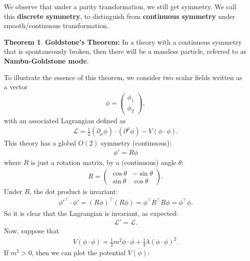 \documentclass[a4paper,11pt]{article}
\numberwithin{equation}{section}
\theoremstyle{definition}
\newtheorem{thm}{Theorem}[section]
\newcommand{\p}{\partial}
\newcommand{\lag}{\mathcal{L}}
\begin{document}
We observe that under a parity transformation, we still get symmetry. We call this \textbf{discrete symmetry}, to distinguish from \textbf{continuous symmetry} under smooth/continuous transformation.\\

\begin{thm}
	\textbf{Goldstone's Theorem:} In a theory with a continuous symmetry that is spontaneously broken, then there will be a massless particle, referred to as \textbf{Nambu-Goldstone mode}. 
\end{thm}
To illustrate the essence of this theorem, we consider two scalar fields written as a vector
\begin{align}
\phi = \begin{pmatrix}
\phi_1 \\ \phi_2
\end{pmatrix},
\end{align}
with an associated Lagrangian defined as
\begin{align}
\lag = \frac{1}{2}(\p_\mu\phi)\cdot(\p^\mu\phi) - V(\phi \cdot \phi).
\end{align}
This theory has a global $O(2)$ symmetry (continuous):
\begin{align}
\phi' = R\phi
\end{align}
where $R$ is just a rotation matrix, by a (continuous) angle $\theta$:
\begin{align}
R = \begin{pmatrix}
\cos\theta & -\sin\theta\\
\sin\theta & \cos\theta
\end{pmatrix}.
\end{align}
Under $R$, the dot product is invariant:
\begin{align}
\phi'^\top\cdot\phi' = (R\phi)^\top(R\phi) = \phi^\top R^\top R\phi = \phi^\top \phi.
\end{align}
So it is clear that the Lagrangian is invariant, as expected:
\begin{align}
\lag' = \lag.
\end{align}
Now, suppose that
\begin{align}
V(\phi\cdot\phi) = \frac{1}{2}m^2\phi\cdot\phi + \frac{1}{4}\lambda(\phi\cdot\phi)^2.
\end{align}
If $m^2 > 0$, then we can plot the potential $V(\phi)$:
\end{document}
